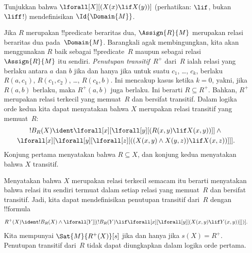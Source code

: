 \documentclass[../../../include/open-logic-section]{subfiles}
\begin{document}
\begin{prob}
Tunjukkan bahwa $\lforall[X][(X(x) \lif X(y))]$ (perhatikan:
$\lif$, bukan~$\liff$!) mendefinisikan $\Id{\Domain{M}}$.
\end{prob}

\begin{ex}
Jika $R$ merupakan !!{predicate} beraritas dua, $\Assign{R}{M}$ merupakan
relasi beraritas dua pada~$\Domain{M}$. Barangkali agak membingungkan, kita
akan menggunakan $R$ baik sebagai !!{predicate}~$R$ maupun sebagai relasi
$\Assign{R}{M}$ itu sendiri. \emph{Penutupan transitif}~$R^+$ dari~$R$ ialah
relasi yang berlaku antara $a$ dan $b$ jika dan hanya jika untuk suatu $c_1$,
\dots, $c_k$, berlaku $R(a,c_1)$, $R(c_1, c_2)$, \dots, $R(c_k,b)$. Ini
mencakup kasus ketika $k = 0$, yakni, jika $R(a,b)$ berlaku, maka $R^+(a,b)$
juga berlaku. Ini berarti $R \subseteq R^+$. Bahkan, $R^+$ merupakan relasi
terkecil yang memuat~$R$ dan bersifat transitif. Dalam logika orde kedua kita
dapat menyatakan bahwa $X$ merupakan relasi transitif yang memuat~$R$:
\begin{multline*}
  !B_R(X) \ident \lforall[x][\lforall[y][(R(x,y) \lif X(x, y))]] \land {}\\
\lforall[x][\lforall[y][\lforall[z][((X(x,y) \land X(y,z)) \lif X(x,
      z))]]].
\end{multline*}
Konjung pertama menyatakan bahwa $R \subseteq X$, dan konjung kedua
menyatakan bahwa $X$ transitif.

Menyatakan bahwa $X$ merupakan relasi terkecil semacam itu berarti menyatakan
bahwa relasi itu sendiri termuat dalam setiap relasi yang memuat~$R$ dan
bersifat transitif. Jadi, kita dapat mendefinisikan penutupan transitif
dari~$R$ dengan !!{formula}
\[
R^+(X) \ident !B_R(X) \land \lforall[Y][(!B_R(Y) \lif
  \lforall[x][\lforall[y][(X(x, y) \lif Y(x,y))]])].
\]
Kita mempunyai $\Sat{M}{R^+(X)}[s]$ jika dan hanya jika $s(X) = R^+$.
Penutupan transitif dari~$R$ tidak dapat diungkapkan dalam logika orde
pertama.
\end{ex}
\end{document}

